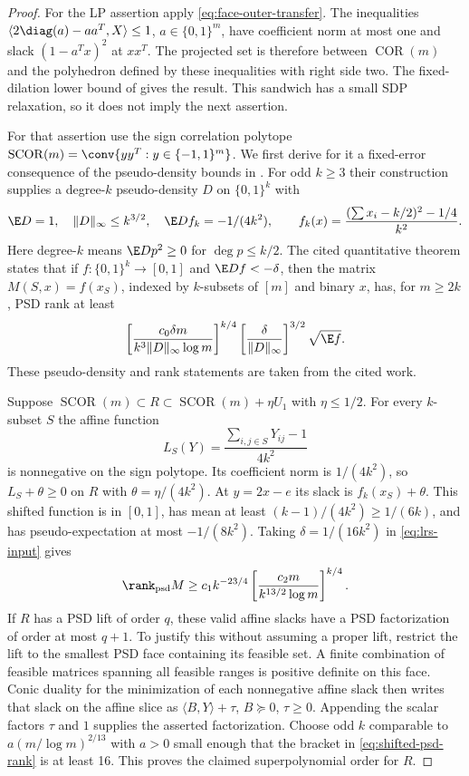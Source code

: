 \begin{proof}
For the LP assertion apply \eqref{eq:face-outer-transfer}. The inequalities
$\langle2\diag(a)-aa^T,X\rangle\le1$, $a\in\{0,1\}^m$, have coefficient
norm at most one and slack $(1-a^Tx)^2$ at $xx^T$. The projected set is
therefore between $\operatorname{COR}(m)$ and the polyhedron defined by
these inequalities with right side two. The fixed-dilation lower bound of
\citet[Theorem 6(i), author version p.\ 18]{BraunEtAl2015} gives the result.
This sandwich has a small SDP relaxation, so it does not imply the next
assertion.

For that assertion use the sign correlation polytope
$\operatorname{SCOR}(m)=\conv\{yy^T:y\in\{-1,1\}^m\}$.
We first derive for it a fixed-error consequence of the pseudo-density
bounds in \citet[Theorem 3.8, equation (3.11), and Theorem 5.3]{LRS2015}.
For odd $k\ge3$ their construction supplies a degree-$k$ pseudo-density
$D$ on $\{0,1\}^k$ with
\[
 \E D=1,\quad\|D\|_\infty\le k^{3/2},\quad
 \E Df_k=-1/(4k^2),\qquad
 f_k(x)=\frac{(\sum x_i-k/2)^2-1/4}{k^2}.
\]
Here degree-$k$ means $\E Dp^2\ge0$ for $\deg p\le k/2$.
The cited quantitative theorem states that if $f:\{0,1\}^k\to[0,1]$
and $\E Df<-\delta$, then the matrix $M(S,x)=f(x_S)$, indexed by
$k$-subsets of $[m]$ and binary $x$, has, for $m\ge2k$, PSD rank at least
\begin{equation}\label{eq:lrs-input}
 \left[\frac{c_0\delta m}{k^3\|D\|_\infty\log m}\right]^{k/4}
 \left[\frac{\delta}{\|D\|_\infty}\right]^{3/2}\sqrt{\E f}.
\end{equation}
These pseudo-density and rank statements are taken from the cited work.

Suppose $\operatorname{SCOR}(m)\subset R\subset
\operatorname{SCOR}(m)+\eta U_1$ with $\eta\le1/2$.
For every $k$-subset $S$ the affine function
\[
 L_S(Y)=\frac{\sum_{i,j\in S}Y_{ij}-1}{4k^2}
\]
is nonnegative on the sign polytope. Its coefficient norm is $1/(4k^2)$,
so $L_S+\theta\ge0$ on $R$ with $\theta=\eta/(4k^2)$.
At $y=2x-e$ its slack is $f_k(x_S)+\theta$. This shifted function is
in $[0,1]$, has mean at least $(k-1)/(4k^2)\ge1/(6k)$, and has
pseudo-expectation at most $-1/(8k^2)$. Taking $\delta=1/(16k^2)$
in \eqref{eq:lrs-input} gives
\begin{equation}\label{eq:shifted-psd-rank}
 \rank_{\rm psd}M\ge c_1k^{-23/4}
 \left[\frac{c_2m}{k^{13/2}\log m}\right]^{k/4}.
\end{equation}
If $R$ has a PSD lift of order $q$, these valid affine slacks have a PSD
factorization of order at most $q+1$. To justify this without assuming
a proper lift, restrict the lift to the smallest PSD face containing its
feasible set. A finite combination of feasible matrices spanning all
feasible ranges is positive definite on this face. Conic duality for the
minimization of each nonnegative affine slack then writes that slack on
the affine slice as $\langle B,Y\rangle+\tau$, $B\succeq0$, $\tau\ge0$.
Appending the scalar factors $\tau$ and $1$ supplies the asserted
factorization. Choose odd $k$ comparable to
$a(m/\log m)^{2/13}$ with $a>0$ small enough that the bracket in
\eqref{eq:shifted-psd-rank} is at least 16. This proves the claimed
superpolynomial order for $R$.


\end{proof}
